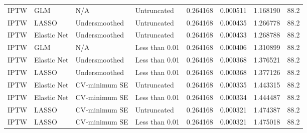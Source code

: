 \begin{longtable}[l]{llllllll}
IPTW & GLM & N/A & Untruncated & 0.264168 & 0.000511 & 1.168190 & 88.2\\
IPTW & LASSO & Undersmoothed & Untruncated & 0.264168 & 0.000435 & 1.266778 & 88.2\\
IPTW & Elastic Net & Undersmoothed & Untruncated & 0.264168 & 0.000433 & 1.268788 & 88.2\\
IPTW & GLM & N/A & Less than 0.01 & 0.264168 & 0.000406 & 1.310899 & 88.2\\
IPTW & Elastic Net & Undersmoothed & Less than 0.01 & 0.264168 & 0.000368 & 1.376521 & 88.2\\
IPTW & LASSO & Undersmoothed & Less than 0.01 & 0.264168 & 0.000368 & 1.377126 & 88.2\\
IPTW & Elastic Net & CV-minimum SE & Untruncated & 0.264168 & 0.000335 & 1.443315 & 88.2\\
IPTW & Elastic Net & CV-minimum SE & Less than 0.01 & 0.264168 & 0.000334 & 1.444487 & 88.2\\
IPTW & LASSO & CV-minimum SE & Untruncated & 0.264168 & 0.000321 & 1.474387 & 88.2\\
IPTW & LASSO & CV-minimum SE & Less than 0.01 & 0.264168 & 0.000321 & 1.475018 & 88.2\\
\bottomrule
\end{longtable}

